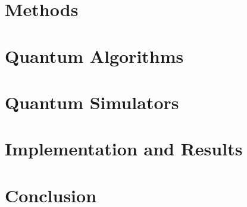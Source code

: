\documentclass[a4paper,11pt]{article}
\begin{document}
\section{Methods} \label{sec:methods}

\section{Quantum Algorithms} \label{sec:quantum-algorithms}

\section{Quantum Simulators} \label{sec:quantum-simulators}

\section{Implementation and Results} \label{sec:implementation-and-results}

\section{Conclusion} \label{sec:conclusion}

\printbibliography[heading=bibintoc]
\end{document}
